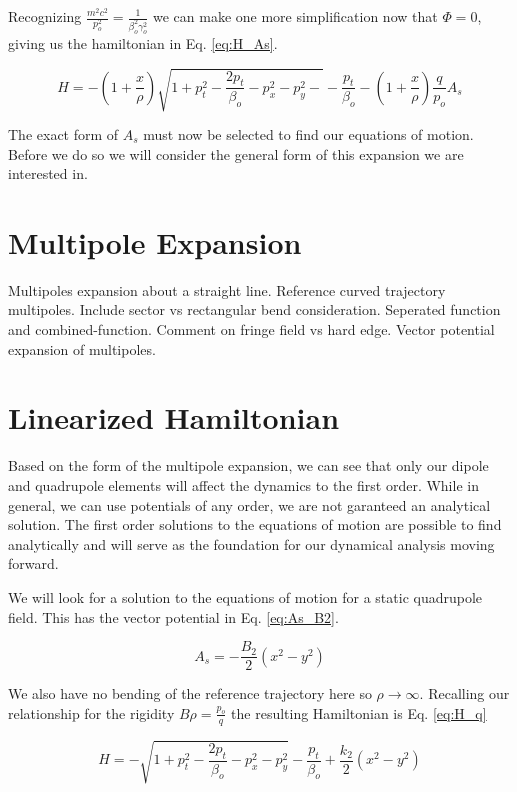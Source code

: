 Recognizing $\frac{m^2c^2}{p_o^2} = \frac{1}{\beta_o^2 \gamma_o^2}$ we can make one more simplification now that $\Phi = 0$, giving us the hamiltonian in Eq. \ref{eq:H_As}.

\begin{equation} \label{eq:H_As}
	H = -\left(1 + \frac{x}{\rho}\right)\sqrt{1 + p_t^2 - \frac{2 p_t}{\beta_o} - p_x^2 - p_y^2- } - \frac{p_t}{\beta_o} - \left(1 + \frac{x}{\rho}\right)\frac{q}{p_o}A_s
\end{equation}

The exact form of $A_s$ must now be selected to find our equations of motion. Before we do so we will consider the general form of this expansion we are interested in.

\section{Multipole Expansion} \label{sec:multipole}

Multipoles expansion about a straight line.
Reference curved trajectory multipoles.
Include sector vs rectangular bend consideration.
Seperated function and combined-function.
Comment on fringe field vs hard edge.
Vector potential expansion of multipoles.

\section{Linearized Hamiltonian} \label{sec:linHam}
Based on the form of the multipole expansion, we can see that only our dipole and quadrupole elements will affect the dynamics to the first order. While in general, we can use potentials of any order, we are not garanteed an analytical solution. The first order solutions to the equations of motion are possible to find analytically and will serve as the foundation for our dynamical analysis moving forward.

We will look for a solution to the equations of motion for a static quadrupole field. This has the vector potential in Eq. \ref{eq:As_B2}.

\begin{equation} \label{eq:As_B2}
	A_s = -\frac{B_2}{2}(x^2 - y^2)
\end{equation}

We also have no bending of the reference trajectory here so $\rho \rightarrow \infty$. Recalling our relationship for the rigidity $B\rho = \frac{p_o}{q}$ the resulting Hamiltonian is Eq. \ref{eq:H_q}

\begin{equation} \label{eq:H_q}
	H = -\sqrt{1 + p_t^2 - \frac{2p_t}{\beta_o} - p_x^2 - p_y^2} - \frac{p_t}{\beta_o} + \frac{k_2}{2}(x^2 - y^2)
\end{equation}

